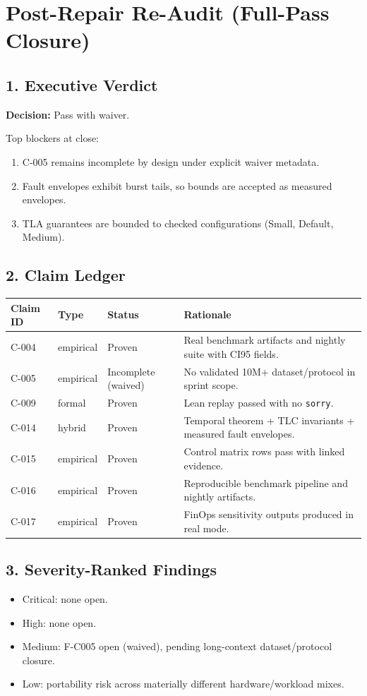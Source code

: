 \documentclass[11pt]{article}
\begin{document}
\section*{Post-Repair Re-Audit (Full-Pass Closure)}

\subsection*{1. Executive Verdict}
\textbf{Decision:} Pass with waiver.

Top blockers at close:
\begin{enumerate}
  \item C-005 remains incomplete by design under explicit waiver metadata.
  \item Fault envelopes exhibit burst tails, so bounds are accepted as measured envelopes.
  \item TLA guarantees are bounded to checked configurations (Small, Default, Medium).
\end{enumerate}

\subsection*{2. Claim Ledger}
\begin{longtable}{llll}
\toprule
Claim ID & Type & Status & Rationale \\
\midrule
C-004 & empirical & Proven & Real benchmark artifacts and nightly suite with CI95 fields. \\
C-005 & empirical & Incomplete (waived) & No validated 10M+ dataset/protocol in sprint scope. \\
C-009 & formal & Proven & Lean replay passed with no \texttt{sorry}. \\
C-014 & hybrid & Proven & Temporal theorem + TLC invariants + measured fault envelopes. \\
C-015 & empirical & Proven & Control matrix rows pass with linked evidence. \\
C-016 & empirical & Proven & Reproducible benchmark pipeline and nightly artifacts. \\
C-017 & empirical & Proven & FinOps sensitivity outputs produced in real mode. \\
\bottomrule
\end{longtable}

\subsection*{3. Severity-Ranked Findings}
\begin{itemize}
  \item Critical: none open.
  \item High: none open.
  \item Medium: F-C005 open (waived), pending long-context dataset/protocol closure.
  \item Low: portability risk across materially different hardware/workload mixes.
\end{itemize}
\end{document}
